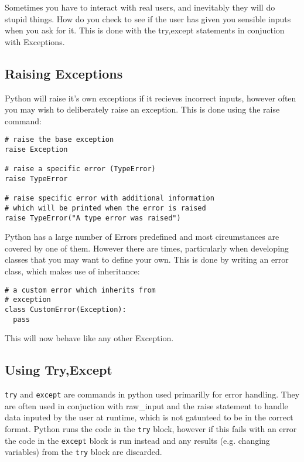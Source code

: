\documentclass[11pt,a4paper]{article}
\begin{document}
Sometimes you have to interact with real users, and inevitably they will do stupid things. How do you check to see if the user has given you sensible inputs when you ask for it. This is done with the try,except statements in conjuction with Exceptions.

\subsection{Raising Exceptions}

Python will raise it's own exceptions if it recieves incorrect inputs, however often you may wish to deliberately raise an exception. This is done using the raise command:

\begin{verbatim}
# raise the base exception
raise Exception

# raise a specific error (TypeError)
raise TypeError

# raise specific error with additional information
# which will be printed when the error is raised
raise TypeError("A type error was raised")
\end{verbatim}

Python has a large number of Errors predefined and most circumstances are covered by one of them. However there are times, particularly when developing classes that you may want to define your own. This is done by writing an error class, which makes use of inheritance:

\begin{verbatim}
# a custom error which inherits from
# exception
class CustomError(Exception):
  pass
\end{verbatim}

This will now behave like any other Exception.

\subsection{Using Try,Except}

\verb|try| and \verb|except| are commands in python used primarilly for error handling. They are often used in conjuction with raw\_input and the raise statement to handle data inputed by the user at runtime, which is not gatunteed to be in the correct format. Python runs the code in the \verb|try| block, however if this fails with an error the code in the \verb|except| block is run instead and any results (e.g. changing variables) from the \verb|try| block are discarded.
\end{document}
